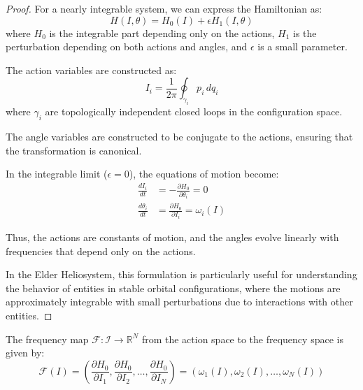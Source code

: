 \begin{proof}
For a nearly integrable system, we can express the Hamiltonian as:
\begin{equation}
H(I, \theta) = H_0(I) + \epsilon H_1(I, \theta)
\end{equation}
where $H_0$ is the integrable part depending only on the actions, $H_1$ is the perturbation depending on both actions and angles, and $\epsilon$ is a small parameter.

The action variables are constructed as:
\begin{equation}
I_i = \frac{1}{2\pi} \oint_{\gamma_i} p_i \, dq_i
\end{equation}
where $\gamma_i$ are topologically independent closed loops in the configuration space.

The angle variables are constructed to be conjugate to the actions, ensuring that the transformation is canonical.

In the integrable limit ($\epsilon = 0$), the equations of motion become:
\begin{align}
\frac{dI_i}{dt} &= -\frac{\partial H_0}{\partial \theta_i} = 0 \\
\frac{d\theta_i}{dt} &= \frac{\partial H_0}{\partial I_i} = \omega_i(I)
\end{align}

Thus, the actions are constants of motion, and the angles evolve linearly with frequencies that depend only on the actions.

In the Elder Heliosystem, this formulation is particularly useful for understanding the behavior of entities in stable orbital configurations, where the motions are approximately integrable with small perturbations due to interactions with other entities.
\end{proof}

\begin{theorem}
The frequency map $\mathcal{F}: \mathcal{I} \to \mathbb{R}^N$ from the action space to the frequency space is given by:
\begin{equation}
\mathcal{F}(I) = \left( \frac{\partial H_0}{\partial I_1}, \frac{\partial H_0}{\partial I_2}, \ldots, \frac{\partial H_0}{\partial I_N} \right) = (\omega_1(I), \omega_2(I), \ldots, \omega_N(I))
\end{equation}
\end{theorem}

